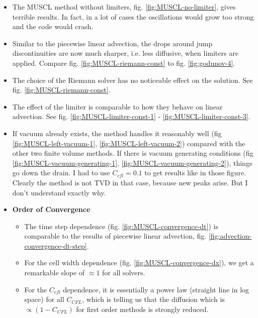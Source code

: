 \begin{itemize}

	\item 	The MUSCL method without limiters, fig. \ref{fig:MUSCL-no-limiter}, gives terrible results.
			In fact, in a lot of cases the oscillations would grow too strong and the code would crash.

	\item 	Similar to the piecewise linear advection, the drops around jump discontinuities are now much sharper, i.e. less diffusive, when limiters are applied.
			Compare fig. \ref{fig:MUSCL-riemann-const} to fig. \ref{fig:godunov-4}.

	\item 	The choice of the Riemann solver has no noticeable effect on the solution. 
			See fig. \ref{fig:MUSCL-riemann-const}.
	
	\item 	The effect of the limiter is comparable to how they behave on linear advection. 
			See fig. \ref{fig:MUSCL-limiter-const-1} - \ref{fig:MUSCL-limiter-const-3}.


	\item 	If vacuum already exists, the method handles it reasonably well (fig \ref{fig:MUSCL-left-vacuum-1}, \ref{fig:MUSCL-left-vacuum-2}) compared with the other two finite volume methods.
			If there is vacuum generating conditions (fig \ref{fig:MUSCL-vacuum-generating-1}, \ref{fig:MUSCL-vacuum-generating-2}), things go down the drain. 
			I had to use $C_{cfl} = 0.1$ to get results like in those figure.
			Clearly the method is not TVD in that case, because new peaks arise.
			But I don't understand exactly why.
			
			

	\item \textbf{Order of Convergence}
	
		\begin{itemize}
			
			\item 	The time step dependence (fig. \ref{fig:MUSCL-convergence-dt}) is comparable to the results of piecewise linear advection, fig. \ref{fig:advection-convergence-dt-step}. 
					
			\item 	For the cell width dependence (fig. \ref{fig:MUSCL-convergence-dx}), we get a remarkable slope of $\approx 1$ for all solvers.

			
			\item 	For the $C_{cfl}$ dependence, it is essentially a power law (straight line in log space) for all $C_{CFL}$, which is telling us that the diffusion which is $\propto (1 - C_{CFL})$ for first order methods is strongly reduced.
		\end{itemize}
\end{itemize}